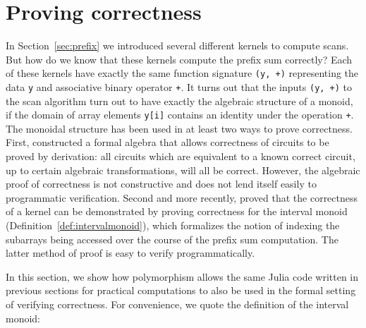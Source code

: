 \documentclass{sig-alternate}
\newcommand{\code}[1]{\texttt{#1}}
\newcommand{\TODO}[1]{\todo[inline]{#1}}
\begin{document}
\TODO{Elaborate}

\section{Proving correctness}

In Section~\ref{sec:prefix} we introduced several different kernels to compute
scans. But how do we know that these kernels compute the prefix sum correctly?
Each of these kernels have exactly the same function signature \code{(y,
+)} representing the data \code{y} and associative binary operator \code{+}.
It turns out that the inputs \code{(y, +)} to the scan algorithm turn out to
have exactly the algebraic structure of a monoid, if the domain of array
elements \code{y[i]} contains an identity under the operation \code{+}. The
monoidal structure has been used in at least two ways to prove correctness.
First, \cite{Hinze2004} constructed a formal algebra that allows correctness of
circuits to be proved by derivation: all circuits which are equivalent to a
known correct circuit, up to certain algebraic transformations, will all be
correct. However, the algebraic proof of correctness is not constructive and
does not lend itself easily to programmatic verification. Second and more
recently, \cite{Chong2014} proved that the correctness of a kernel can be
demonstrated by proving correctness for the interval monoid
(Definition~\ref{def:intervalmonoid}), which formalizes the notion of indexing
the subarrays being accessed over the course of the prefix sum computation. The
latter method of proof is easy to verify programmatically.

In this section, we show how polymorphism allows the same Julia code written in
previous sections for practical computations to also be used in the formal
setting of verifying correctness. For convenience, we quote the definition of
the interval monoid:
\end{document}
